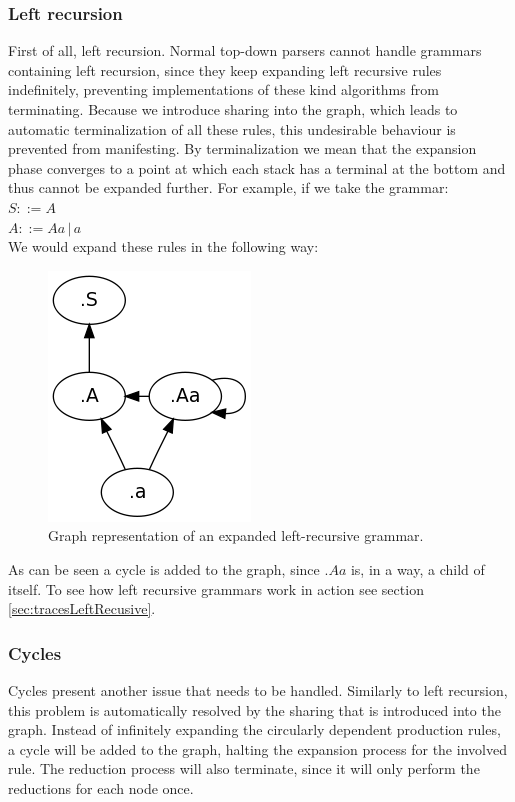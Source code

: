 \documentclass[a4paper,10pt]{article}
\begin{document}
\subsubsection{Left recursion}
First of all, left recursion. Normal top-down parsers cannot handle grammars containing left recursion, since they keep expanding left recursive rules indefinitely, preventing implementations of these kind algorithms from terminating. Because we introduce sharing into the graph, which leads to automatic terminalization of all these rules, this undesirable behaviour is prevented from manifesting. By terminalization we mean that the expansion phase converges to a point at which each stack has a terminal at the bottom and thus cannot be expanded further. For example, if we take the grammar:\\
$S ::= A$\\
$A ::= Aa\,|\,a$\\
We would expand these rules in the following way:
\begin{figure}[H]
\centering
\includegraphics[scale=0.5]{left-recursive.png}
\caption{Graph representation of an expanded left-recursive grammar.}
\end{figure}
As can be seen a cycle is added to the graph, since $.Aa$ is, in a way, a child of itself. To see how left recursive grammars work in action see section \ref{sec:tracesLeftRecusive}.

\subsubsection{Cycles}
Cycles present another issue that needs to be handled. Similarly to left recursion, this problem is automatically resolved by the sharing that is introduced into the graph. Instead of infinitely expanding the circularly dependent production rules, a cycle will be added to the graph, halting the expansion process for the involved rule. The reduction process will also terminate, since it will only perform the reductions for each node once.
\end{document}
